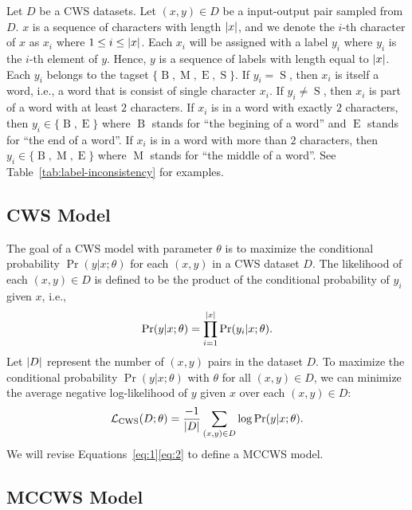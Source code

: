 \documentclass[11pt]{article}
\newcommand{\set}[1]{\lbrace #1 \rbrace}
\newcommand{\loss}{\mathcal{L}}
\newcommand{\BTag}{\operatorname{B}}
\newcommand{\MTag}{\operatorname{M}}
\newcommand{\ETag}{\operatorname{E}}
\newcommand{\STag}{\operatorname{S}}
\newcommand{\TagSet}{\set{\BTag, \MTag, \ETag, \STag}}
\newcommand{\opCWS}{\operatorname{CWS}}
\DeclarePairedDelimiter{\abs}{\lvert}{\rvert}
\begin{document}
Let \(D\) be a CWS datasets.
Let \((x, y) \in D\) be a input-output pair sampled from \(D\).
\(x\) is a sequence of characters with length \(\abs{x}\), and we denote the \(i\)-th character of \(x\) as \(x_i\) where \(1 \leq i \leq \abs{x}\).
Each \(x_i\) will be assigned with a label \(y_i\) where \(y_i\) is the \(i\)-th element of \(y\).
Hence, \(y\) is a sequence of labels with length equal to \(\abs{x}\).
Each \(y_i\) belongs to the tagset \(\TagSet\).
If \(y_i = \STag\), then \(x_i\) is itself a word, i.e., a word that is consist of single character \(x_i\).
If \(y_i \neq \STag\), then \(x_i\) is part of a word with at least \(2\) characters.
If \(x_i\) is in a word with exactly \(2\) characters, then \(y_i \in \set{\BTag, \ETag}\) where \(\BTag\) stands for ``the begining of a word'' and \(\ETag\) stands for ``the end of a word''.
If \(x_i\) is in a word with more than \(2\) characters, then \(y_i \in \set{\BTag, \MTag, \ETag}\) where \(\MTag\) stands for ``the middle of a word''.
See Table~\ref{tab:label-inconsistency} for examples.

\subsection{CWS Model}\label{sec:cws}

The goal of a CWS model with parameter \(\theta\) is to maximize the conditional probability \(\Pr(y | x ; \theta)\) for each \((x, y)\) in a CWS dataset \(D\).
The likelihood of each \((x, y) \in D\) is defined to be the product of the conditional probability of \(y_i\) given \(x\), i.e.,
\begin{equation}\label{eq:1}
  \Pr(y | x ; \theta) = \prod_{i = 1}^{\abs{x}} \Pr(y_i | x ; \theta).
\end{equation}
Let \(\abs{D}\) represent the number of \((x, y)\) pairs in the dataset \(D\).
To maximize the conditional probability \(\Pr(y | x ; \theta)\) with \(\theta\) for all \((x, y) \in D\), we can minimize the average negative log-likelihood of \(y\) given \(x\) over each \((x, y) \in D\):
\begin{equation}\label{eq:2}
  \loss_{\opCWS}(D ; \theta) = \dfrac{-1}{\abs{D}} \sum_{(x, y) \in D} \log \Pr(y|x ; \theta).
\end{equation}
We will revise Equations~\eqref{eq:1}\eqref{eq:2} to define a MCCWS model.

\subsection{MCCWS Model}\label{sec:mccws}
\end{document}
